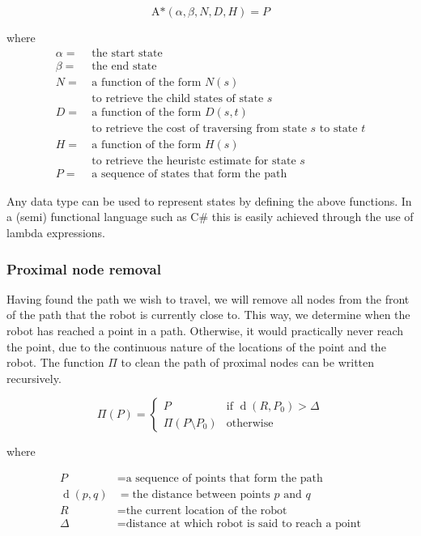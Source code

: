 \documentclass[10pt, abstracton]{scrartcl}
\DeclareMathOperator{\dist}{d}
\begin{document}
\[
\textrm{A*}(\alpha,\beta,N,D,H) = P
\]

where
\begin{align*}
\alpha =&\ \textrm{the start state} \\
\beta =&\ \textrm{the end state} \\
N =&\ \textrm{a function of the form $N(s)$} \\
&\ \textrm{to retrieve the child states of state $s$} \\
D =&\ \textrm{a function of the form $D(s,t)$} \\
&\ \textrm{to retrieve the cost of traversing from state $s$ to state $t$} \\
H =&\ \textrm{a function of the form $H(s)$} \\
&\ \textrm{to retrieve the heuristc estimate for state $s$} \\
P =&\ \textrm{a sequence of states that form the path}
\end{align*}

Any data type can be used to represent states by defining the above functions. In a (semi) functional language such as C\# this is easily achieved through the use of lambda expressions.

\subsubsection{Proximal node removal}
Having found the path we wish to travel, we will remove all nodes from the front of the path that the robot is currently close to. This way, we determine when the robot has reached a point in a path. Otherwise, it would practically never reach the point, due to the continuous nature of the locations of the point and the robot. The function $\Pi$ to clean the path of proximal nodes can be written recursively.

\[
\Pi(P) =
	\begin{cases}
	P & \textrm{if } \dist(R,P_0) > \Delta \\
	\Pi( P \setminus P_0 ) & \textrm{otherwise}
	\end{cases}
\]

where

\begin{align*}
P &= \textrm{a sequence of points that form the path} \\
\dist(p,q) &= \textrm{the distance between points $p$ and $q$} \\
R &= \textrm{the current location of the robot} \\
\Delta &= \textrm{distance at which robot is said to reach a point}
\end{align*}
\end{document}
